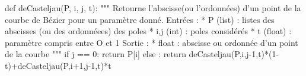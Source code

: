 \documentclass[10pt,fleqn]{article} %
\begin{document}
\begin{py}

\begin{python}
def deCasteljau(P, i, j, t):
    """
    Retourne l'abscisse(ou l'ordonnées) d'un point de la courbe de Bézier pour un paramètre donné.
    Entrées : 
     * P (list) : listes des abscisses (ou des ordonnéees) des poles
     * i,j (int) : poles considérés
     * t (float) : paramètre compris entre O et 1
    Sortie : 
     * float : abscisse ou ordonnée d'un point de la courbe 
    """
    if j == 0:
        return P[i]
    else : 
        return deCasteljau(P,i,j-1,t)*(1-t)+deCasteljau(P,i+1,j-1,t)*t
\end{python}
\end{py}
\fi
\end{document}
